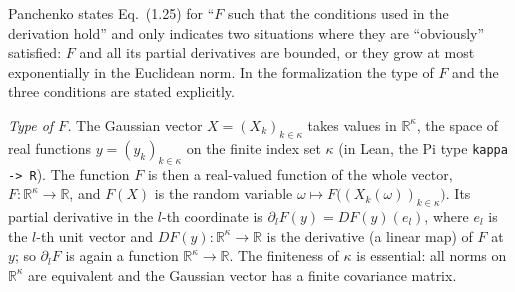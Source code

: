 \begin{remark}\label{rem:sg:steinvec-assumptions}
Panchenko states Eq.~(1.25) for ``$F$ such that the conditions used in the derivation hold'' and only indicates two
situations where they are ``obviously'' satisfied: $F$ and all its partial derivatives are bounded, or they grow at most
exponentially in the Euclidean norm. In the formalization the type of $F$ and the three conditions are stated explicitly.

\emph{Type of $F$.} The Gaussian vector $X=(X_k)_{k\in\kappa}$ takes values in $\mathbb R^\kappa$, the space of real functions
$y=(y_k)_{k\in\kappa}$ on the finite index set $\kappa$ (in Lean, the Pi type \texttt{kappa -> R}).
The function $F$ is then a real-valued function of the whole vector, $F:\mathbb R^\kappa\to\mathbb R$, and $F(X)$ is the random
variable $\omega\mapsto F\big((X_k(\omega))_{k\in\kappa}\big)$. Its partial derivative in the $l$-th coordinate is
$\partial_lF(y)=DF(y)(e_l)$, where $e_l$ is the $l$-th unit vector and $DF(y):\mathbb R^\kappa\to\mathbb R$ is the derivative
(a linear map) of $F$ at $y$; so $\partial_lF$ is again a function $\mathbb R^\kappa\to\mathbb R$. The finiteness of $\kappa$ is
essential: all norms on $\mathbb R^\kappa$ are equivalent and the Gaussian vector has a finite covariance matrix.


\end{remark}
